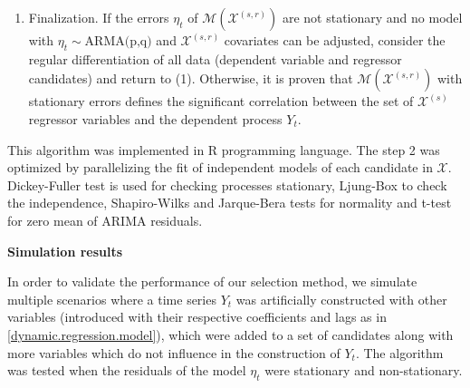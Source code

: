 \documentclass[twoside]{article}
\begin{document}
\begin{enumerate}
    \item Finalization. If the errors $\eta_t$ of $\mathcal{M}(\mathcal{X}^{(s,r)})$ are not stationary and no model with $\eta_t\sim\text{ARMA(p,q)}$ and $\mathcal{X}^{(s,r)}$ covariates can be adjusted, consider the regular differentiation of all data (dependent variable and regressor candidates) and return to (1). Otherwise, it is proven that  $\mathcal{M}(\mathcal{X}^{(s,r)})$ with stationary errors defines the significant correlation between the set of $\mathcal{X}^{(s)}$ regressor variables and the dependent process $Y_t$.
\end{enumerate}

This algorithm was implemented in R programming language. The step 2 was optimized by parallelizing the fit of independent models of each candidate in $\mathcal{X}$.  Dickey-Fuller test is used for checking processes stationary, Ljung-Box to check the independence, Shapiro-Wilks and Jarque-Bera tests for normality and t-test for zero mean of ARIMA residuals. 

\begin{center}
    \textbf{Simulation results}
\end{center}

In order to validate the performance of our selection method, we simulate multiple scenarios where a time series $Y_t$ was artificially constructed with other variables (introduced with their respective coefficients and lags as in \ref{dynamic.regression.model}), which were added to a set of candidates along with more variables which do not influence in the construction of $Y_t$. The algorithm was tested when the residuals of the model $\eta_t$ were stationary and non-stationary. 
\end{document}
